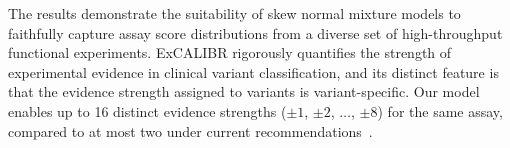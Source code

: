 \documentclass[11pt]{article}
\theoremstyle{plain}
\newcommand{\excalibr}{ExCALIBR\xspace}
\begin{document}
The results demonstrate the suitability of skew normal mixture models to faithfully capture assay score distributions from a diverse set of high-throughput functional experiments. \excalibr rigorously quantifies the strength of experimental evidence in clinical variant classification, and its distinct feature is that the evidence strength assigned to variants is variant-specific. Our model enables up to 16 distinct evidence strengths ($\pm1$, $\pm2$, $\ldots$, $\pm8$) for the same assay, compared to at most two under current recommendations~\cite{brnich2020recommendations}. %

\end{document}
